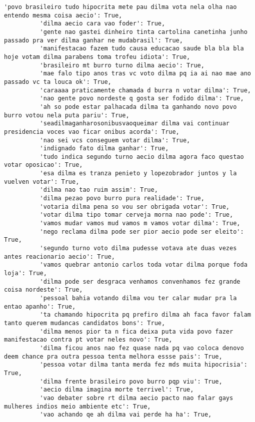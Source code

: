\documentclass[11pt]{article}
\begin{document}
\begin{Verbatim}[commandchars=\\\{\}]
          'povo brasileiro tudo hipocrita mete pau dilma vota nela olha nao entendo mesma coisa aecio': True,
          'dilma aecio cara vao foder': True,
          'gente nao gastei dinheiro tinta cartolina canetinha junho passado pra ver dilma ganhar ne mudabrasil': True,
          'manifestacao fazem tudo causa educacao saude bla bla bla hoje votam dilma parabens toma trofeu idiota': True,
          'brasileiro mt burro turno dilma aecio': True,
          'mae falo tipo anos tras vc voto dilma pq ia ai nao mae ano passado vc ta louca ok': True,
          'caraaaa praticamente chamada d burra n votar dilma': True,
          'nao gente povo nordeste q gosta ser fodido dilma': True,
          'ah so pode estar palhacada dilma ta ganhando novo povo burro votou nela puta pariu': True,
          'seadilmaganharosonibusvaoqueimar dilma vai continuar presidencia voces vao ficar onibus acorda': True,
          'nao sei vcs conseguem votar dilma': True,
          'indignado fato dilma ganhar': True,
          'tudo indica segundo turno aecio dilma agora faco questao votar oposicao': True,
          'esa dilma es tranza penieto y lopezobrador juntos y la vuelven votar': True,
          'dilma nao tao ruim assim': True,
          'dilma pezao povo burro pura realidade': True,
          'votaria dilma pena so vou ser obrigada votar': True,
          'votar dilma tipo tomar cerveja morna nao pode': True,
          'vamos mudar vamos mud vamos m vamos votar dilma': True,
          'nego reclama dilma pode ser pior aecio pode ser eleito': True,
          'segundo turno voto dilma pudesse votava ate duas vezes antes reacionario aecio': True,
          'vamos quebrar antonio carlos toda votar dilma porque foda loja': True,
          'dilma pode ser desgraca venhamos convenhamos fez grande coisa nordeste': True,
          'pessoal bahia votando dilma vou ter calar mudar pra la entao apanho': True,
          'ta chamando hipocrita pq prefiro dilma ah faca favor falam tanto querem mudancas candidatos bons': True,
          'dilma menos pior ta n fica deixa puta vida povo fazer manifestacao contra pt votar neles novo': True,
          'dilma ficou anos nao fez quase nada pq vao coloca denovo deem chance pra outra pessoa tenta melhora essse pais': True,
          'pessoa votar dilma tanta merda fez mds muita hipocrisia': True,
          'dilma frente brasileiro povo burro pqp viu': True,
          'aecio dilma imagina morte terrivel': True,
          'vao debater sobre rt dilma aecio pacto nao falar gays mulheres indios meio ambiente etc': True,
          'vao achando qe ah dilma vai perde ha ha': True,

\end{Verbatim}
\end{document}
